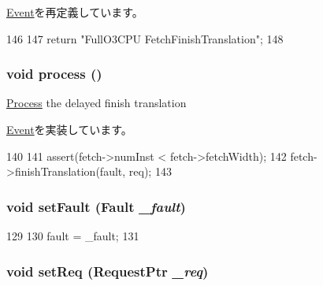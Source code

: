 \hyperlink{classEvent_a130ddddf003422b413e2e891b1b80e8f}{Event}を再定義しています。


\begin{DoxyCode}
146         {
147             return "FullO3CPU FetchFinishTranslation";
148         }
\end{DoxyCode}
\hypertarget{classDefaultFetch_1_1FinishTranslationEvent_a2e9c5136d19b1a95fc427e0852deab5c}{
\subsubsection[{process}]{\setlength{\rightskip}{0pt plus 5cm}void process ()}}
\label{classDefaultFetch_1_1FinishTranslationEvent_a2e9c5136d19b1a95fc427e0852deab5c}
\hyperlink{classProcess}{Process} the delayed finish translation 

\hyperlink{classEvent_a142b75b68a6291400e20fb0dd905b1c8}{Event}を実装しています。


\begin{DoxyCode}
140         {
141             assert(fetch->numInst < fetch->fetchWidth);
142             fetch->finishTranslation(fault, req);
143         }
\end{DoxyCode}
\hypertarget{classDefaultFetch_1_1FinishTranslationEvent_a82a42da62f864cd0227ac4b7596709a7}{
\subsubsection[{setFault}]{\setlength{\rightskip}{0pt plus 5cm}void setFault ({\bf Fault} {\em \_\-fault})}}
\label{classDefaultFetch_1_1FinishTranslationEvent_a82a42da62f864cd0227ac4b7596709a7}



\begin{DoxyCode}
129         {
130             fault = _fault;
131         }
\end{DoxyCode}
\hypertarget{classDefaultFetch_1_1FinishTranslationEvent_aa90c345490b78a0a0d46cbdd6e4d61a6}{
\subsubsection[{setReq}]{\setlength{\rightskip}{0pt plus 5cm}void setReq ({\bf RequestPtr} {\em \_\-req})}}
\label{classDefaultFetch_1_1FinishTranslationEvent_aa90c345490b78a0a0d46cbdd6e4d61a6}




